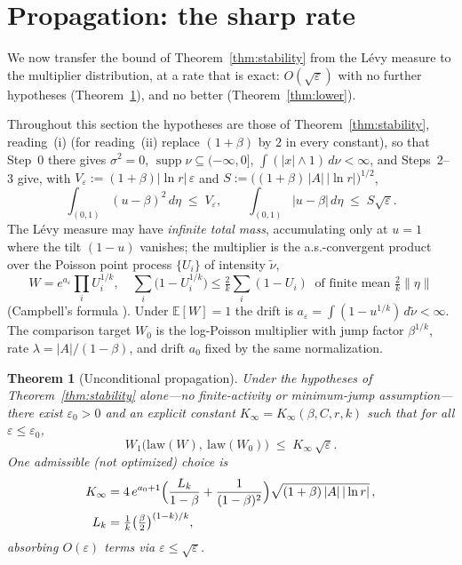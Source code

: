 \documentclass[pdflatex,sn-mathphys-num]{sn-jnl}
\theoremstyle{thmstyleone}
\newtheorem{theorem}{Theorem}
\theoremstyle{thmstyletwo}
\theoremstyle{thmstylethree}
\DeclareMathOperator{\supp}{supp}
\begin{document}
\section{Propagation: the sharp rate}
\label{sec:propagation}

We now transfer the bound of Theorem~\ref{thm:stability} from the
L\'evy measure to the multiplier distribution, at a rate that is
exact: $O(\sqrt\varepsilon)$ with no further hypotheses
(Theorem~\ref{thm:propagation}), and no better
(Theorem~\ref{thm:lower}).

Throughout this section the hypotheses are those of
Theorem~\ref{thm:stability}, reading~(i) (for reading~(ii) replace
$(1+\beta)$ by $2$ in every constant), so that Step~0 there gives
$\sigma^2 = 0$, $\supp\nu \subseteq (-\infty,0]$,
$\int(|x|\wedge1)\,d\nu < \infty$, and Steps~2--3 give, with
$V_\varepsilon := (1+\beta)|\ln r|\,\varepsilon$ and
$S := \bigl((1+\beta)\,|A|\,|\ln r|\bigr)^{1/2}$,
\begin{equation}\label{eq:VF}
  \int_{(0,1)}(u-\beta)^2\,d\eta \;\le\; V_\varepsilon,
  \qquad
  \int_{(0,1)}|u-\beta|\,d\eta \;\le\; S\sqrt{\varepsilon} .
\end{equation}
The L\'evy measure may have \emph{infinite total mass},
accumulating only at $u = 1$ where the tilt $(1-u)$ vanishes; the
multiplier is the a.s.-convergent product over the Poisson point
process $\{U_i\}$ of intensity $\tilde\nu$,
\[
  W = e^{a_\varepsilon}\prod_i U_i^{1/k},
  \quad
  \sum_i\bigl(1 - U_i^{1/k}\bigr) \le \tfrac2k\sum_i(1-U_i)
  \ \text{ of finite mean } \tfrac2k\|\eta\|
\]
(Campbell's formula \cite{Kin93}).  Under $\mathbb{E}[W]=1$ the
drift is $a_\varepsilon = \int(1-u^{1/k})\,d\tilde\nu < \infty$.
The comparison target $W_0$ is the log-Poisson multiplier with jump
factor $\beta^{1/k}$, rate $\lambda = |A|/(1-\beta)$, and drift
$a_0$ fixed by the same normalization.

\begin{theorem}[Unconditional propagation]\label{thm:propagation}
Under the hypotheses of Theorem~\textup{\ref{thm:stability}}
alone---no finite-activity or minimum-jump assumption---there exist
$\varepsilon_0 > 0$ and an explicit constant $K_\infty =
K_\infty(\beta, C, r, k)$ such that for all $\varepsilon \le
\varepsilon_0$,
\[
  W_1\bigl(\mathrm{law}(W),\ \mathrm{law}(W_0)\bigr)
  \;\le\; K_\infty\,\sqrt{\varepsilon}.
\]
One admissible (not optimized) choice is
\[
\begin{aligned}
  K_\infty &= 4\,e^{a_0+1}\Bigl(\frac{L_k}{1-\beta}
  + \frac{1}{(1-\beta)^2}\Bigr)
  \sqrt{(1+\beta)\,|A|\,|\ln r|}\,,\\
  L_k &= \tfrac1k\bigl(\tfrac\beta2\bigr)^{(1-k)/k},
\end{aligned}
\]
absorbing $O(\varepsilon)$ terms via $\varepsilon \le
\sqrt\varepsilon$.
\end{theorem}
\end{document}
